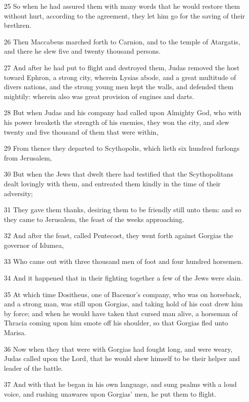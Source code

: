 \par 25 So when he had assured them with many words that he would restore them without hurt, according to the agreement, they let him go for the saving of their brethren.
\par 26 Then Maccabeus marched forth to Carnion, and to the temple of Atargatis, and there he slew five and twenty thousand persons.
\par 27 And after he had put to flight and destroyed them, Judas removed the host toward Ephron, a strong city, wherein Lysias abode, and a great multitude of divers nations, and the strong young men kept the walls, and defended them mightily: wherein also was great provision of engines and darts.
\par 28 But when Judas and his company had called upon Almighty God, who with his power breaketh the strength of his enemies, they won the city, and slew twenty and five thousand of them that were within,
\par 29 From thence they departed to Scythopolis, which lieth six hundred furlongs from Jerusalem,
\par 30 But when the Jews that dwelt there had testified that the Scythopolitans dealt lovingly with them, and entreated them kindly in the time of their adversity;
\par 31 They gave them thanks, desiring them to be friendly still unto them: and so they came to Jerusalem, the feast of the weeks approaching.
\par 32 And after the feast, called Pentecost, they went forth against Gorgias the governor of Idumea,
\par 33 Who came out with three thousand men of foot and four hundred horsemen.
\par 34 And it happened that in their fighting together a few of the Jews were slain.
\par 35 At which time Dositheus, one of Bacenor's company, who was on horseback, and a strong man, was still upon Gorgias, and taking hold of his coat drew him by force; and when he would have taken that cursed man alive, a horseman of Thracia coming upon him smote off his shoulder, so that Gorgias fled unto Marisa.
\par 36 Now when they that were with Gorgias had fought long, and were weary, Judas called upon the Lord, that he would shew himself to be their helper and leader of the battle.
\par 37 And with that he began in his own language, and sung psalms with a loud voice, and rushing unawares upon Gorgias' men, he put them to flight.
